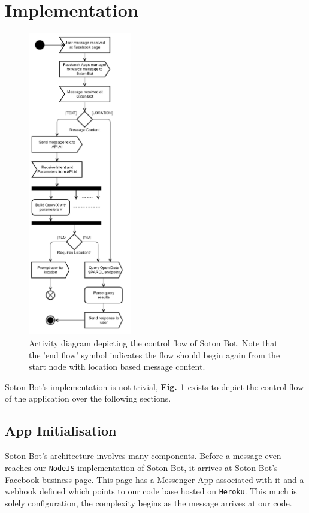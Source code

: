 \documentclass[journal, a4paper]{IEEEtran}
\begin{document}
\section{Implementation}

\begin{figure}
	\centering
    \includegraphics[width=0.4\textwidth]{images/activitydiagram.png}
   	\centering
	\caption{Activity diagram depicting the control flow of Soton Bot. Note that the 'end flow' symbol indicates the flow should begin again from the start node with location based message content.}
    \label{fig:activity_diagram}
\end{figure}

Soton Bot's implementation is not trivial, \textbf{Fig. \ref{fig:activity_diagram}} exists to depict the control flow of the application over the following sections. 

\subsection{App Initialisation}
Soton Bot's architecture involves many components. Before a message even reaches our \texttt{NodeJS} implementation of Soton Bot, it arrives at Soton Bot's Facebook business page. This page has a Messenger App associated with it and a webhook defined which points to our code base hosted on \texttt{Heroku}. This much is solely configuration, the complexity begins as the message arrives at our code.\\ 
\end{document}
